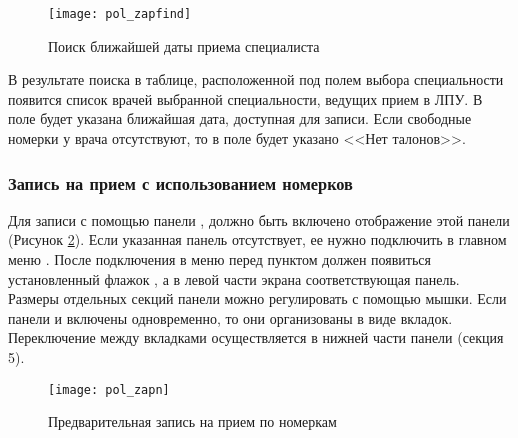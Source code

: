 \begin{figure}[ht]\centering
 \texttt{[image: pol\_zapfind]}
 \caption{Поиск ближайшей даты приема специалиста}
 \label{img_pol_zapfind}
\end{figure}

В результате поиска в таблице, расположенной под полем выбора специальности появится список врачей выбранной специальности, ведущих прием в ЛПУ. В поле  будет указана ближайшая дата, доступная для записи. Если свободные номерки у врача отсутствуют, то в поле  будет указано <<Нет талонов>>.

\subsubsection{Запись на прием с использованием номерков}

Для записи с помощью панели , должно быть включено отображение этой панели (Рисунок \ref{img_pol_zapn}). Если указанная панель отсутствует, ее нужно подключить в главном меню . После подключения в меню перед пунктом  должен появиться установленный флажок \putx, а в левой части экрана соответствующая панель. Размеры отдельных секций панели можно регулировать с помощью мышки. Если панели  и  включены одновременно, то они организованы в виде вкладок. Переключение между вкладками осуществляется в нижней части панели (секция 5).

\begin{figure}[ht]\centering
 \texttt{[image: pol\_zapn]}
 \caption{Предварительная запись на прием по номеркам}
 \label{img_pol_zapn}
\end{figure}  

